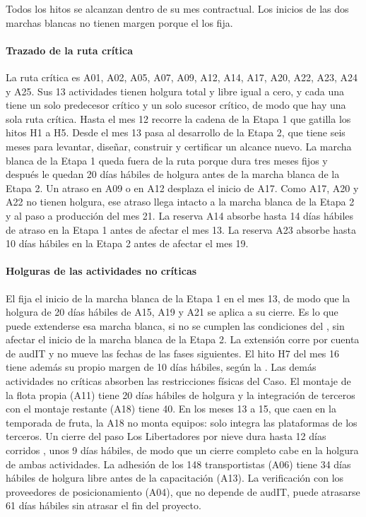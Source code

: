 Todos los hitos se alcanzan dentro de su mes contractual. Los inicios de las dos marchas blancas no
tienen margen porque el  los fija.

\paragraph{Trazado de la ruta crítica}
La ruta crítica es A01, A02, A05, A07, A09, A12, A14, A17, A20, A22, A23, A24 y A25. Sus 13
actividades tienen holgura total y libre igual a cero, y cada una tiene un solo predecesor crítico y un
solo sucesor crítico, de modo que hay una sola ruta crítica. Hasta el mes 12 recorre la cadena de la
Etapa 1 que gatilla los hitos H1 a H5. Desde el mes 13 pasa al desarrollo de la Etapa 2, que tiene seis
meses para levantar, diseñar, construir y certificar un alcance nuevo. La marcha blanca de la Etapa 1
queda fuera de la ruta porque dura tres meses fijos y después le quedan 20 días hábiles de holgura
antes de la marcha blanca de la Etapa 2. Un atraso en A09 o en A12 desplaza el inicio de A17. Como A17,
A20 y A22 no tienen holgura, ese atraso llega intacto a la marcha blanca de la Etapa 2 y al paso a
producción del mes 21. La reserva A14 absorbe hasta 14 días hábiles de atraso en la Etapa 1 antes de
afectar el mes 13. La reserva A23 absorbe hasta 10 días hábiles en la Etapa 2 antes de afectar el
mes 19.

\paragraph{Holguras de las actividades no críticas}
El  fija el inicio de la marcha blanca de la Etapa 1 en el mes 13, de modo que la holgura
de 20 días hábiles de A15, A19 y A21 se aplica a su cierre. Es lo que puede extenderse esa marcha
blanca, si no se cumplen las condiciones del , sin afectar el inicio de la marcha blanca
de la Etapa 2. La extensión corre por cuenta de audIT y no mueve las fechas de las fases siguientes. El
hito H7 del mes 16 tiene además su propio margen de 10 días hábiles, según la . Las
demás actividades no críticas absorben las restricciones físicas del Caso. El montaje de la flota propia (A11)
tiene 20 días hábiles de holgura y la integración de terceros con el montaje restante (A18) tiene 40.
En los meses 13 a 15, que caen en la temporada de fruta, la A18 no monta equipos: solo integra las
plataformas de los terceros. Un cierre del paso Los
Libertadores por nieve dura hasta 12 días corridos , unos 9 días hábiles, de
modo que un cierre completo cabe en la holgura de ambas actividades. La adhesión de los 148
transportistas (A06) tiene 34 días hábiles de holgura libre antes de la capacitación (A13). La
verificación con los proveedores de posicionamiento (A04), que no depende de audIT, puede atrasarse 61
días hábiles sin atrasar el fin del proyecto.

